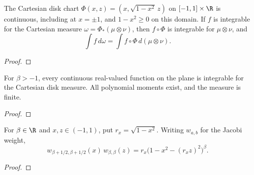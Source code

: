\begin{supporting}
\begin{theorem}
\label{thm:disk-coordinate-characterisation}
\leanok
The Cartesian disk chart
$\Phi(x,z)=(x,\sqrt{1-x^2}\,z)$ on $[-1,1]\times\R$ is continuous,
including at $x=\pm1$, and $1-x^2\ge0$ on this domain.
If $f$ is integrable for the Cartesian measure
$\omega=\Phi_*(\mu\otimes\nu)$, then $f\circ\Phi$ is integrable for
$\mu\otimes\nu$, and
\[
 \int f\,d\omega=\int f\circ\Phi\,d(\mu\otimes\nu).
\]
\end{theorem}
\begin{proof}
\leanok
\end{proof}

\begin{theorem}
\label{thm:disk-integrability}
\leanok
For $\beta>-1$, every continuous real-valued function on the plane is integrable for the
Cartesian disk measure. All polynomial moments exist, and the measure is finite.
\end{theorem}
\begin{proof}
\leanok
\end{proof}

\begin{theorem}
\label{thm:disk-weight-jacobian}
\leanok
For $\beta\in\R$ and $x,z\in(-1,1)$, put $r_x=\sqrt{1-x^2}$.
Writing $w_{a,b}$ for the Jacobi weight,
\[
 w_{\beta+1/2,\beta+1/2}(x)\,w_{\beta,\beta}(z)
 =r_x\bigl(1-x^2-(r_xz)^2\bigr)^\beta.
\]
\end{theorem}
\begin{proof}
\leanok
\end{proof}


\end{supporting}

